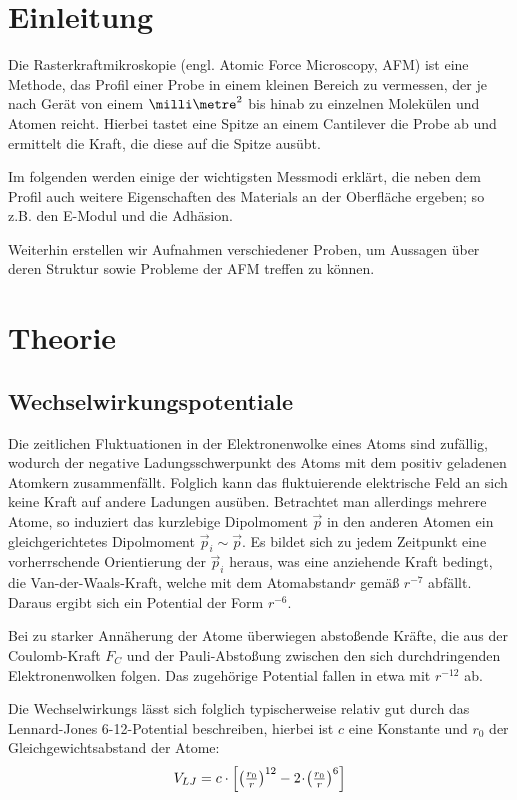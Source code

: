 
\section{Einleitung}
Die Rasterkraftmikroskopie (engl. Atomic Force Microscopy, AFM) ist eine Methode, das Profil einer Probe in einem kleinen Bereich zu vermessen, der je nach Gerät von einem $\milli\metre^2$ bis hinab zu einzelnen Molekülen und Atomen reicht. Hierbei tastet eine Spitze an einem Cantilever die Probe ab und ermittelt die Kraft, die diese auf die Spitze ausübt.

Im folgenden werden einige der wichtigsten Messmodi erklärt, die neben dem Profil auch weitere Eigenschaften des Materials an der Oberfläche ergeben; so z.B. den E-Modul und die Adhäsion.

Weiterhin erstellen wir Aufnahmen verschiedener Proben, um Aussagen über deren Struktur sowie Probleme der AFM treffen zu können. 

\newpage
\section{Theorie}
\subsection{Wechselwirkungspotentiale}
Die zeitlichen Fluktuationen in der Elektronenwolke eines Atoms sind zufällig, wodurch der negative Ladungsschwerpunkt des Atoms mit dem positiv geladenen Atomkern zusammenfällt. Folglich kann das fluktuierende elektrische Feld an sich keine Kraft auf andere Ladungen ausüben. Betrachtet man allerdings mehrere Atome, so induziert das kurzlebige Dipolmoment $\vec p$ in den anderen Atomen ein gleichgerichtetes Dipolmoment $\vec p_i \sim \vec p$. Es bildet sich zu jedem Zeitpunkt eine  vorherrschende Orientierung der $\vec p_i$ heraus, was eine anziehende Kraft bedingt, die Van-der-Waals-Kraft, welche mit dem Atomabstand$r$ gemäß $r^{-7}$ abfällt. Daraus ergibt sich ein Potential der Form $r^{-6}$.

Bei zu starker Annäherung der Atome überwiegen abstoßende Kräfte, die aus der Coulomb-Kraft $F_C$ und der Pauli-Abstoßung zwischen den sich durchdringenden Elektronenwolken folgen. Das zugehörige Potential fallen in etwa mit $r^{-12}$ ab.

Die Wechselwirkungs lässt sich folglich typischerweise relativ gut durch das Lennard-Jones 6-12-Potential beschreiben, hierbei ist $c$ eine Konstante und $r_0$ der Gleichgewichtsabstand der Atome:
\begin{equation}
  V_{LJ} = c \cdot \left[ \left(\tfrac{r_0}{r}\right)^{12} - 2 \!\cdot\! \left(\tfrac{r_0}{r}\right)^{6} \right]
\end{equation}

